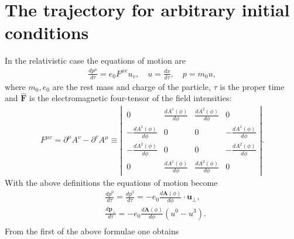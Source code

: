 \section[The trajectory for arbitrary initial conditions]{The trajectory for arbitrary initial conditions}\label{sec:smooth-mono-trajectory}
In the relativistic case the equations of motion are
\begin{align}
  \frac{d p^{\mu}}{d \tau}=e_{0} F^{\mu v} u_{v}, \quad u=\frac{d x}{d \tau}, \quad p=m_{0} u, \label{II.2.3.1}
\end{align}
where $m_{0}, e_{0}$ are the rest mass and charge of the particle, $\tau$ is the proper time and $\hat{\mathbf{F}}$ is the electromagnetic four-tensor of the field intensities:
\begin{align}
  F^{\mu v}=\partial^{\mu} A^{v}-\partial^{v} A^{\mu} \equiv \left\lvert\, \begin{array}{cccc}
                                                                             0                             & \frac{d A^{1}(\phi)}{d \phi} & \frac{d A^{2}(\phi)}{d \phi} & 0                             \\
                                                                             -\frac{d A^{1}(\phi)}{d \phi} & 0                            & 0                            & -\frac{d A^{1}(\phi)}{d \phi} \\
                                                                             -\frac{d A^{2}(\phi)}{d \phi} & 0                            & 0                            & -\frac{d A^{2}(\phi)}{d \phi} \\
                                                                             0                             & \frac{d A^{1}(\phi)}{d \phi} & \frac{d A^{2}(\phi)}{d \phi} & 0
                                                                           \end{array}\right\rvert . \label{II.2.3.2}
\end{align}
With the above definitions the equations of motion become
\begin{align}
   & \frac{d p^{0}}{d \tau}=\frac{d p^{3}}{d \tau}=-e_{0} \frac{d \mathbf{A}(\phi)}{d \phi} \cdot \mathbf{u}_{\perp},  \label{II.2.3.3} \\
   & \frac{d \mathbf{p}_{\perp}}{d \tau}=-e_{0} \frac{d \mathbf{A}(\phi)}{d \phi}\left(u^{0}-u^{3}\right) . \label{II.2.3.4}            \\
\end{align}
From the first of the above formulae one obtains
